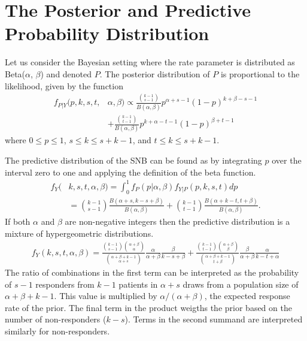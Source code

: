 \documentclass[12pt]{article}
\begin{document}
\section{The Posterior and Predictive Probability Distribution}

Let us consider the Bayesian setting where the rate parameter is distributed 
as Beta($\alpha$, $\beta$) and denoted $P$.
The posterior distribution of $P$ is proportional to the 
likelihood, given by the function
\begin{align} \label{eqn:ptl}
f_{P|Y}(p, k, s, t, & \alpha, \beta) \propto
  \frac{ {k-1 \choose s-1} }{B(\alpha, \beta)} p^{\alpha +s -1} 
    (1-p)^{k+\beta-s-1} \\
  & + \frac{ {k-1 \choose t-1} }{B(\alpha, \beta)} p^{k+\alpha -t -1} 
    (1-p)^{\beta+t-1} \nonumber
\end{align}
where $0 \leq p \leq 1$, $s \leq k \leq s+k-1$, and $t \leq k \leq s+k-1$.

The predictive distribution of the SNB can be found as by integrating
$p$ over the interval zero to one and applying the definition of the 
beta function.
\begin{align} \label{eqn:predictive}
f_{Y}(&k, s, t, \alpha, \beta) = 
  \int_0^1 f_P(p | \alpha, \beta )  f_{Y|P}(p, k, s, t) dp \nonumber \\ 
 & = {k-1 \choose s-1} \frac{B\left(\alpha+s, k-s+\beta \right)}{B(\alpha, \beta)} 
    + {k-1 \choose t-1} 
    \frac{B\left(\alpha + k - t, t+\beta\right)}{B(\alpha, \beta)}.
\end{align}
If both $\alpha$ and $\beta$ are non-negative integers then the predictive
distribution is a mixture of hypergeometric distributions. 
\begin{align*} \label{eqn:hypergeo}
f_{Y}(k, s, t, \alpha, \beta) = 
  \frac{ {k - 1 \choose s - 1 } 
         {\alpha + \beta \choose \alpha} }{
         {\alpha + \beta + k - 1 \choose \alpha + s}}
  \frac{\alpha}{\alpha + \beta}
  \frac{ \beta }{ k-s+\beta } +
  \frac{ {k - 1 \choose t - 1} 
         {\alpha + \beta \choose \beta} 
         }{
         {\alpha + \beta + k -1 \choose t + \beta}
       }
  \frac{ \beta }{ \alpha + \beta}
  \frac{ \alpha }{ k-t + \alpha}
\end{align*}
The ratio of combinations in the first term can be interpreted as the
probability of $s-1$ responders from $k-1$ patients in $\alpha + s$ draws
from a population size of $\alpha + \beta + k - 1$. This value is multiplied
by $\alpha / (\alpha + \beta)$, the expected response rate of the prior. 
The final term in the product weigths the prior based on the number
of non-responders ($k-s$). Terms in the second summand are interpreted similarly
for non-responders.
\end{document}
